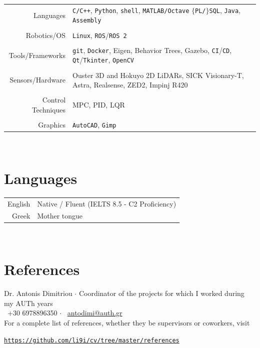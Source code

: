 \documentclass[a4paper,10pt,twoside]{article}
\begin{document}
\begin{tabular}{rp{11cm}}
Languages & \texttt{C/C++}, \texttt{Python}, \texttt{shell}, \texttt{MATLAB/Octave} $\{$\texttt{PL/}$\}$\texttt{SQL}, \texttt{Java}, \texttt{Assembly} \\
&\\
Robotics/OS & \texttt{Linux},  \texttt{ROS}/\texttt{ROS 2} \\
&\\
Tools/Frameworks & \texttt{git}, \texttt{Docker}, Eigen, Behavior Trees, Gazebo, \texttt{CI}/\texttt{CD}, \texttt{Qt}/\texttt{Tkinter}, \texttt{OpenCV} \\
&\\
Sensors/Hardware & Ouster 3D and Hokuyo 2D LiDARs, SICK Visionary-T, Astra, Realsense, ZED2, Impinj R420 \\
&\\
Control Techniques & MPC, PID, LQR \\
&\\
Graphics & \texttt{AutoCAD}, \texttt{Gimp}\\
\end{tabular}\\


\section{Languages}

\begin{tabular}{rp{12cm}}
English & Native / Fluent (IELTS 8.5 - C2 Proficiency) \\
Greek & Mother tongue
\end{tabular}\\

\section{References}
\noindent Dr. Antonis Dimitriou $\cdot$ Coordinator of the projects for which I worked during my AUTh years \\
\faPhone \ +30 6978896350 $\cdot$ \faEnvelopeO \ \href{mailto:antodimi@auth.gr}{antodimi@auth.gr} \\

\noindent For a complete list of references, whether they be supervisors or coworkers, visit
\begin{center}\noindent
\href{https://mozilla.github.io/pdf.js/web/viewer.html?file=https://raw.githubusercontent.com/li9i/cv/master/references/references_alexandros_filotheou.pdf}{\texttt{https://github.com/li9i/cv/tree/master/references}}
\end{center}

\vspace*{\fill}
\end{document}
